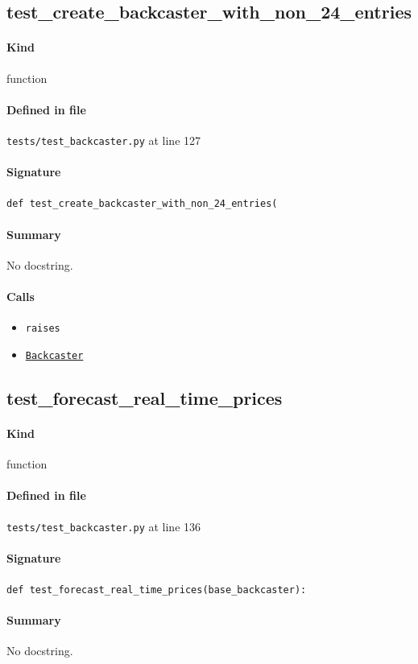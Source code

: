 \documentclass[11pt]{report}
\begin{document}
\subsection{test\_create\_backcaster\_with\_non\_24\_entries}
\label{def:tests-test_backcaster.py:test_create_backcaster_with_non_24_entries:L127}
\paragraph{Kind} function
\paragraph{Defined in file} \texttt{tests/test\_backcaster.py} at line 127
\paragraph{Signature} \texttt{def test\_create\_backcaster\_with\_non\_24\_entries(}
\paragraph{Summary} No docstring.
\paragraph{Calls}
\begin{itemize}[leftmargin=*]
  \item \texttt{raises}
  \item \hyperref[def:forecaster.py:Backcaster:L321]{\texttt{Backcaster}}
\end{itemize}
\subsection{test\_forecast\_real\_time\_prices}
\label{def:tests-test_backcaster.py:test_forecast_real_time_prices:L136}
\paragraph{Kind} function
\paragraph{Defined in file} \texttt{tests/test\_backcaster.py} at line 136
\paragraph{Signature} \texttt{def test\_forecast\_real\_time\_prices(base\_backcaster):}
\paragraph{Summary} No docstring.
\end{document}
